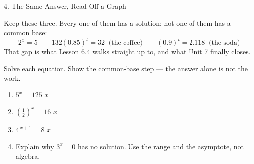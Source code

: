\documentclass[10pt]{article}
\begin{document}
\begin{notesbox}{4. The Same Answer, Read Off a Graph}
\begin{tcolorbox}[colback=sky, colframe=navy, boxrule=0.8pt, arc=1.5mm,
    left=2.5mm, right=2.5mm, top=1.5mm, bottom=1.5mm]
\vspace{2pt}
Keep these three. Every one of them has a solution; not one of them has a common base:
\[
  2^{x}=5 \qquad 132(0.85)^{t}=32 \;\;\text{(the coffee)} \qquad (0.9)^{t}=2.118 \;\;\text{(the soda)}
\]
That gap is what Lesson 6.4 walks straight up to, and what Unit 7 finally closes.
\end{tcolorbox}
\end{notesbox}

\begin{practicebox}
Solve each equation. Show the common-base step --- the answer alone is not the work.
\begin{enumerate}[leftmargin=1.7em, itemsep=9pt]
  \item $5^{x}=125$ \hfill $x=$ \blank{2.0cm}

  \item $\left(\frac{1}{2}\right)^{x}=16$ \hfill $x=$ \blank{2.0cm}

  \item $4^{\,x+1}=8$ \hfill $x=$ \blank{2.0cm}

  \item Explain why $3^{x}=0$ has no solution. Use the range and the asymptote, not algebra.
\end{enumerate}
\end{practicebox}
\end{document}
